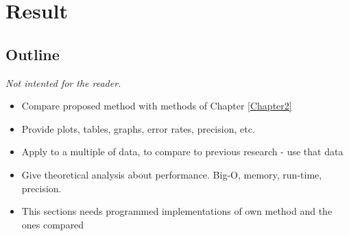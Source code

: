 
\chapter{Result}

\label{Chapter5} %


\section{Outline}
\emph{Not intented for the reader.}
\begin{itemize}
  \item Compare proposed method with methods of Chapter \ref{Chapter2}
  \item Provide plots, tables, graphs, error rates, precision, etc.
  \item Apply to a multiple of data, to compare to previous research - use that data
  \item Give theoretical analysis about performance. Big-O, memory, run-time, precision.
  \item This sections needs programmed implementations of own method and the ones compared
\end{itemize}



